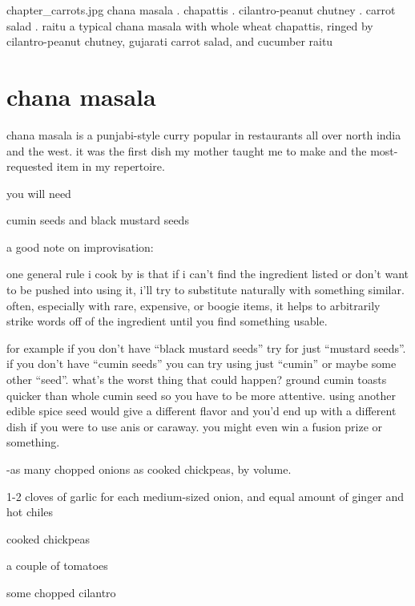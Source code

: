 \mychapter
{chapter_carrots.jpg}
{chana masala . chapattis . cilantro-peanut chutney . carrot salad . raitu}
{a typical chana masala with whole wheat chapattis,
ringed by cilantro-peanut chutney, gujarati carrot salad, and cucumber
raitu}

\section{\gls{chana masala}}

chana masala is a punjabi-style curry popular in restaurants all over north 
india and the west. it was the first dish my mother taught me to make and the 
most-requested item in my repertoire.

you will need

\begin{ingredients}
  \item cumin seeds and black mustard seeds
\end{ingredients}

a good note on improvisation:

one general rule i cook by is that if i can't find the ingredient listed or 
don't want to be pushed into using it, i'll try to substitute naturally with 
something similar. often, especially with rare, expensive, or boogie items, it 
helps to arbitrarily strike words off of the ingredient until you find 
something usable.

for example if you don't have ``black mustard seeds'' try for just ``mustard 
seeds''. if you don't have ``cumin seeds'' you can try using just ``cumin'' or 
maybe some other ``seed''. what's the worst thing that could happen? ground 
cumin toasts quicker than whole cumin seed so you have to be more attentive. 
using another edible spice seed would give a different flavor and you'd end up 
with a different dish if you were to use anis or caraway. you might even win a 
fusion prize or something.

\begin{ingredients}
  \item \onethird -\onehalf as many chopped onions as cooked chickpeas, by volume.
  \item 1-2 cloves of garlic for each medium-sized onion, and equal amount of ginger and hot chiles
  \item cooked chickpeas
  \item a couple of tomatoes
  \item some chopped cilantro
\end{ingredients}

